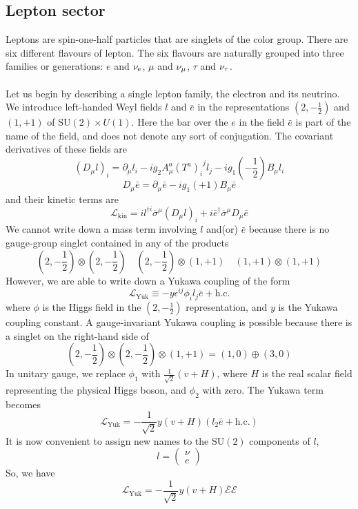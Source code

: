 \subsection{Lepton sector}
Leptons are spin-one-half particles that are singlets of the color group. There are six different flavours of lepton. The six flavours are naturally grouped into three families or generations: $e$ and $\nu_{\rm e}$, $\mu$ and $\nu_{\rm \mu}$, $\tau$ and $\nu_{\rm \tau}$.
\\ \\
Let us begin by describing a single lepton family, the electron and its neutrino. We introduce left-handed Weyl fields $l$ and $\bar{e}$ in the representations $(2,-\frac{1}{2})$ and $(1,+1)$ of $\mathrm{SU}(2)\times U(1)$. 
Here the bar over the $e$ in the field $\bar{e}$ is part of the name of the field, and does not denote any sort of conjugation. The covariant derivatives of these fields are
\[(D_{\mu}l)_i = \partial_{\mu}l_i - ig_2A^a_{\mu}(T^a)_{i}^{\phantom{j}j}l_j - ig_1(-\frac{1}{2})B_{\mu}l_i\]
\[D_{\mu}\bar{e} = \partial_{\mu}\bar{e} - ig_1(+1)B_{\mu}\bar{e}\]
and their kinetic terms are
\[\mathcal{L}_{\mathrm{kin}} = il^{\dagger i} \overline{\sigma}^{\mu}(D_{\mu}l)_i + i\bar{e}^{\dagger}\overline{\sigma}^{\mu}D_{\mu}\bar{e}\]
We cannot write down a mass term involving $l$ and(or) $\bar{e}$ because there is no gauge-group singlet contained in any of the products
\[(2,-\frac{1}{2}) \otimes (2,-\frac{1}{2}) \quad (2,-\frac{1}{2}) \otimes (1, +1) \quad (1, +1) \otimes (1, +1)\]
However, we are able to write down a Yukawa coupling of the form
\[\mathcal{L}_{\mathrm{Yuk}} \equiv -y\epsilon^{ij}\phi_i l_j \bar{e} + \mathrm{h.c.}\]
where $\phi$ is the Higgs field in the $(2,-\frac{1}{2})$ representation, and $y$ is the Yukawa coupling constant. A gauge-invariant Yukawa coupling is possible because there is a singlet on the right-hand side of
\[(2,-\frac{1}{2}) \otimes (2,-\frac{1}{2}) \otimes (1,+1) = (1,0) \oplus (3,0)\]
In unitary gauge, we replace $\phi_1$ with $\frac{1}{\sqrt{2}}(v+H)$, where $H$ is the real scalar field representing the physical Higgs boson, and $\phi_2$ with zero. The Yukawa term becomes
\[\mathcal{L}_{\mathrm{Yuk}} = -\frac{1}{\sqrt{2}}y(v+H)(l_2\bar{e} + \mathrm{h.c.})\]
It is now convenient to assign new names to the $\mathrm{SU}(2)$ components of $l$,
\[l = \begin{pmatrix}
\nu \\ e
\end{pmatrix} \]
So, we have
\[\mathcal{L}_{\mathrm{Yuk}} = -\frac{1}{\sqrt{2}}y(v+H)\overline{\mathcal{E}}\mathcal{E}\]
